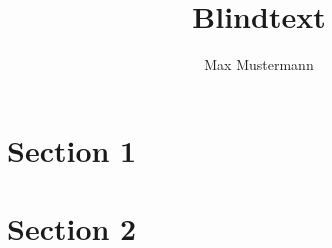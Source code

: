 \documentclass[fontsize=5pt]{scrartcl}
\title{Blindtext}
\author{Max Mustermann}
\begin{document}
 \maketitle
 \section*{Section 1}
 \blindtext
 \section*{Section 2}
 \blindtext
 
\end{document}
